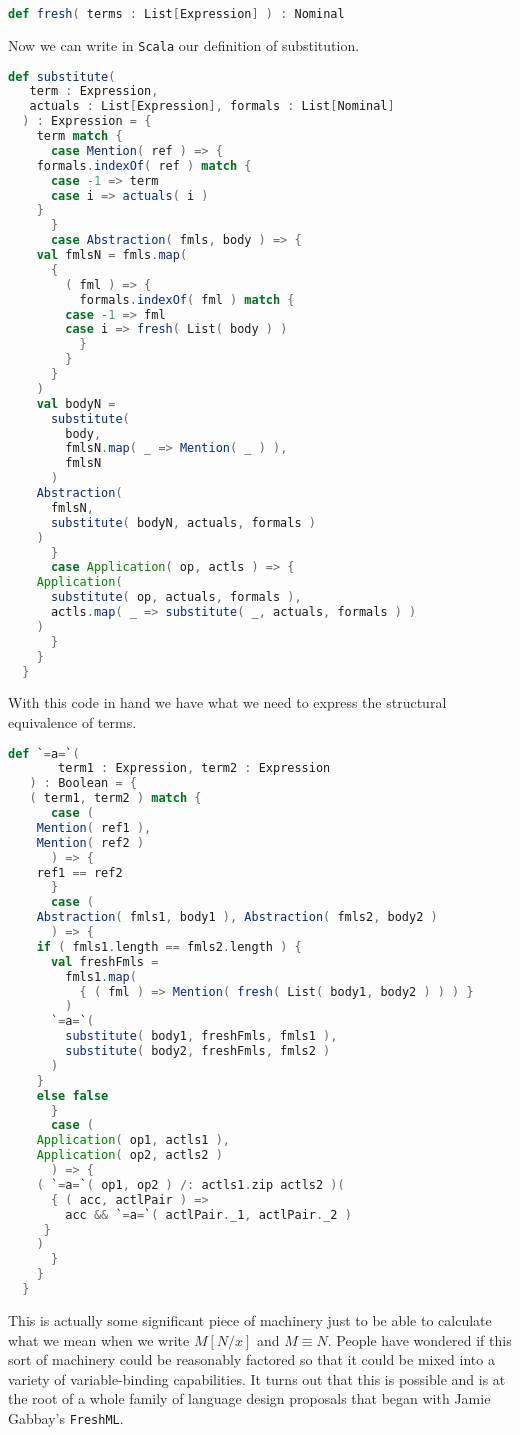 \begin{lstlisting}[language=Scala]
  def fresh( terms : List[Expression] ) : Nominal
\end{lstlisting}

Now we can write in \texttt{Scala} our definition of substitution.

\break
\begin{lstlisting}[language=Scala]
   def substitute(
   term : Expression,
   actuals : List[Expression], formals : List[Nominal]
  ) : Expression = {
    term match {
      case Mention( ref ) => {
	formals.indexOf( ref ) match {
	  case -1 => term
	  case i => actuals( i )
	}
      }
      case Abstraction( fmls, body ) => {
	val fmlsN = fmls.map(
	  {
	    ( fml ) => {
	      formals.indexOf( fml ) match {
		case -1 => fml
		case i => fresh( List( body ) )
	      }
	    }
	  }	      
	)
	val bodyN =
	  substitute(
	    body,
	    fmlsN.map( _ => Mention( _ ) ),
	    fmlsN
	  )
	Abstraction(
	  fmlsN,
	  substitute( bodyN, actuals, formals )
	)
      }
      case Application( op, actls ) => {
	Application(
	  substitute( op, actuals, formals ),
	  actls.map( _ => substitute( _, actuals, formals ) )
	)
      }
    }
  }
\end{lstlisting}

With this code in hand we have what we need to express the structural
equivalence of terms.

\begin{lstlisting}[language=Scala]  
  def `=a=`(
       term1 : Expression, term2 : Expression
   ) : Boolean = {
   ( term1, term2 ) match {
      case (
	Mention( ref1 ),
	Mention( ref2 )
      ) => {
	ref1 == ref2
      }
      case (
	Abstraction( fmls1, body1 ), Abstraction( fmls2, body2 )
      ) => {
	if ( fmls1.length == fmls2.length ) {
	  val freshFmls =
	    fmls1.map(
	      { ( fml ) => Mention( fresh( List( body1, body2 ) ) ) }
	    )
	  `=a=`(
	    substitute( body1, freshFmls, fmls1 ),
	    substitute( body2, freshFmls, fmls2 )
	  )
	}
	else false
      }      
      case (
	Application( op1, actls1 ),
	Application( op2, actls2 )
      ) => {
	( `=a=`( op1, op2 ) /: actls1.zip actls2 )(
	  { ( acc, actlPair ) =>
	    acc && `=a=`( actlPair._1, actlPair._2 )
	 }
	)
      }
    }
  }
\end{lstlisting}

This is actually some significant piece of machinery just to be able
to calculate what we mean when we write $M[N/x]$ and $M \equiv N$.
People have wondered if this sort of machinery could be reasonably
factored so that it could be mixed into a variety of variable-binding
capabilities. It turns out that this is possible and is at the root of
a whole family of language design proposals that began with Jamie
Gabbay's \texttt{FreshML}.

